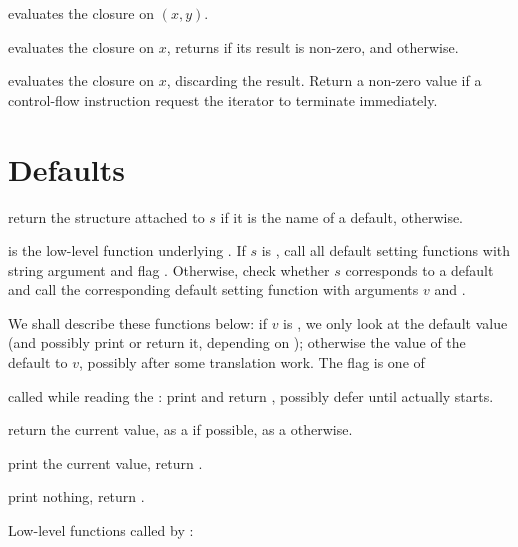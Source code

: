  evaluates the closure 
on $(x,y)$.

 evaluates the closure  on
$x$, returns  if its result is non-zero, and  otherwise.

 evaluates the closure  on
$x$, discarding the result. Return a non-zero value if a control-flow
instruction request the iterator to terminate immediately.

\section{Defaults}

 return the 
structure attached to $s$ if it is the name of a default, 
otherwise.

 is the
low-level function underlying . If $s$ is , call all
default setting functions with string argument  and flag
. Otherwise, check whether $s$ corresponds to a default
and call the corresponding default setting function with arguments $v$ and
\fl.

We shall describe these functions below: if $v$ is , we only look
at the default value (and possibly print or return it, depending on
); otherwise the value of the default to $v$, possibly after some
translation work. The flag is one of

\item {} called while reading the : print and return
, possibly defer until  actually starts.

\item {} return the current value, as a  if possible, as
a  otherwise.

\item {} print the current value, return .

\item {} print nothing, return .

\noindent Low-level functions called by :




